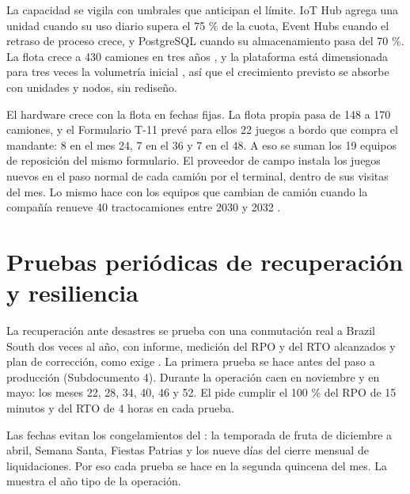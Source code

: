 La capacidad se vigila con umbrales que anticipan el límite. IoT Hub agrega una unidad cuando su uso
diario supera el 75 \% de la cuota, Event Hubs cuando el retraso de proceso crece, y PostgreSQL cuando su
almacenamiento pasa del 70 \%. La flota crece a 430 camiones en tres años , y la
plataforma está dimensionada para tres veces la volumetría inicial , así que el
crecimiento previsto se absorbe con unidades y nodos, sin rediseño.

El hardware crece con la flota en fechas fijas. La flota propia pasa de 148 a 170 camiones, y el
Formulario T-11 prevé para ellos 22 juegos a bordo que compra el mandante: 8 en el mes 24, 7 en el 36 y
7 en el 48. A eso se suman los 19 equipos de reposición del mismo formulario. El proveedor de campo instala los juegos nuevos en el paso normal de cada camión por el
terminal, dentro de sus visitas del mes. Lo mismo hace con los equipos que cambian de camión cuando la
compañía renueve 40 tractocamiones entre 2030 y 2032 .

\section{Pruebas periódicas de recuperación y resiliencia}\label{sec:11-pruebas-periodicas-de-recuperaci}

La recuperación ante desastres se prueba con una conmutación real a Brazil South dos veces al año, con
informe, medición del RPO y del RTO alcanzados y plan de corrección, como exige
. La primera prueba se hace antes del paso a producción (Subdocumento 4). Durante
la operación caen en noviembre y en mayo: los meses 22, 28, 34, 40, 46 y 52. El  pide
cumplir el 100 \% del RPO de 15 minutos y del RTO de 4 horas en cada prueba.

Las fechas evitan los congelamientos del : la temporada de fruta de diciembre a
abril, Semana Santa, Fiestas Patrias y los nueve días del cierre mensual de liquidaciones. Por eso cada
prueba se hace en la segunda quincena del mes. La  muestra el año tipo de la
operación.

